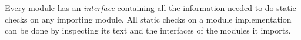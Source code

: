 Every module has an {\em interface}
containing all the information needed to do static checks on any
importing module.  All static checks on a module implementation can be
done by inspecting its text and the interfaces of the modules
it imports.

%
%
%

